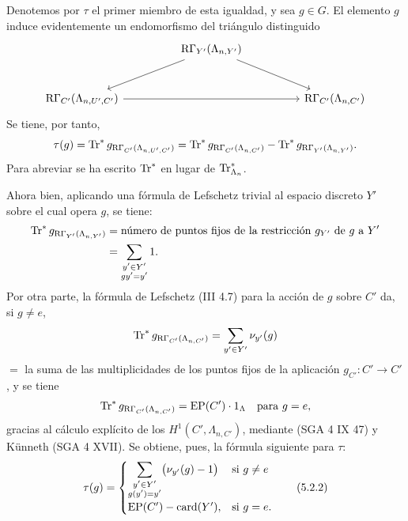 Denotemos por $\tau$ el primer miembro de esta igualdad, y sea $g\in G$. El elemento $g$ induce evidentemente un endomorfismo del triángulo distinguido
\[
\begin{tikzcd}[column sep=huge,row sep=large]
& \RG_{Y'}(\Lambda_{n,Y'}) \arrow[dl] \arrow[dr] & \\
\RG_{C'}(\Lambda_{n,U',C'}) \arrow[rr] && \RG_{C'}(\Lambda_{n,C'})
\end{tikzcd}
\]
Se tiene, por tanto,
\[
\tau(g)=\operatorname{Tr}^*g_{\mathrm{R}\Gamma_{C'}(\Lambda_{n,U',C'})}
=\operatorname{Tr}^*g_{\mathrm{R}\Gamma_{C'}(\Lambda_{n,C'})}
-\operatorname{Tr}^*g_{\mathrm{R}\Gamma_{Y'}(\Lambda_{n,Y'})}.
\]
Para abreviar se ha escrito $\operatorname{Tr}^*$ en lugar de $\operatorname{Tr}^*_{\Lambda_n}$.

Ahora bien, aplicando una fórmula de Lefschetz trivial al espacio discreto $Y'$ sobre el cual opera $g$, se tiene:
\[
\begin{aligned}
\operatorname{Tr}^*g_{\mathrm{R}\Gamma_{Y'}(\Lambda_{n,Y'})}
&=\text{número de puntos fijos de la restricción } g_{Y'} \text{ de } g \text{ a } Y'\\
&=\sum_{\substack{y'\in Y'\\gy'=y'}}1.
\end{aligned}
\]
Por otra parte, la fórmula de Lefschetz (III 4.7) para la acción de $g$ sobre $C'$ da, si $g\ne e$,
\[
\operatorname{Tr}^*g_{\mathrm{R}\Gamma_{C'}(\Lambda_{n,C'})}
=
\sum_{y'\in Y'} \nu_{y'}(g)
\]
$=$ la suma de las multiplicidades de los puntos fijos de la aplicación $g_{C'}:C'\to C'$, y se tiene
\[
\operatorname{Tr}^*g_{\mathrm{R}\Gamma_{C'}(\Lambda_{n,C'})}=\operatorname{EP}(C')\cdot1_\Lambda
\quad\text{para }g=e,
\]
gracias al cálculo explícito de los $H^1(C',\Lambda_{n,C'})$, mediante (SGA 4 IX 47) y Künneth (SGA 4 XVII). Se obtiene, pues, la fórmula siguiente para $\tau$:
\[
\tau(g)=
\begin{cases}
\displaystyle\sum_{\substack{y'\in Y'\\g(y')=y'}}\bigl(\nu_{y'}(g)-1\bigr)& \text{si } g\ne e\\[0.8em]
\operatorname{EP}(C')-\operatorname{card}(Y'),& \text{si } g=e.
\end{cases}
\tag{5.2.2}
\]
